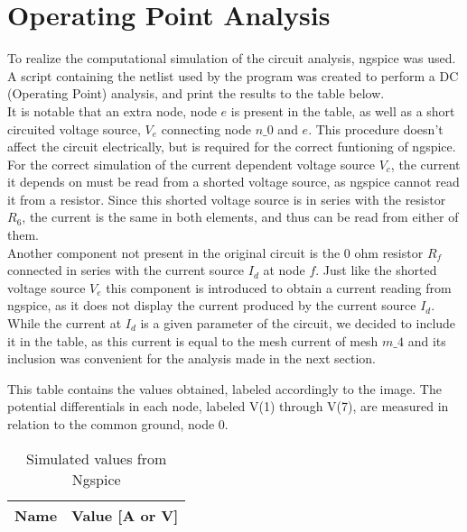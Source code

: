 \section{Operating Point Analysis}
\label{sec:simulation}

To realize the computational simulation of the circuit analysis, ngspice was used. A script containing the netlist used by the program was created to perform a DC (Operating Point) analysis, and print the results to the table below.\\
It is notable that an extra node, node $e$ is present in the table, as well as a short circuited voltage source, $V_{e}$ connecting node $n\_0$ and $e$. This procedure doesn't affect the circuit electrically, but is required for the correct funtioning of ngspice. For the correct simulation of the current dependent voltage source $V_{c}$, the current it depends on must be read from a shorted voltage source, as ngspice cannot read it from a resistor. Since this shorted voltage source is in series with the resistor $R_{6}$, the current is the same in both elements, and thus can be read from either of them.\\
Another component not present in the original circuit is the 0 ohm resistor $R_{f}$ connected in series with the current source $I_{d}$ at node $f$. Just like the shorted voltage source $V_{e}$ this component is introduced to obtain a current reading from ngspice, as it does not display the current produced by the current source $I_{d}$. While the current at $I_{d}$ is a given parameter of the circuit, we decided to include it in the table, as this current is equal to the mesh current of mesh $m\_4$ and its inclusion was convenient for the analysis made in the next section.

This table contains the values obtained, labeled accordingly to the image. The potential differentials in each node, labeled V(1) through V(7), are measured in relation to the common ground, node 0. 


\FloatBarrier
\begin{table}[h]
  \centering
  \begin{tabular}{|l|r|}
    \hline    
    {\bf Name} & {\bf Value [A or V]} \\ \hline
    
  \end{tabular}
  \caption{Simulated values from Ngspice}
  \label{tab:op}
\end{table}
\FloatBarrier


